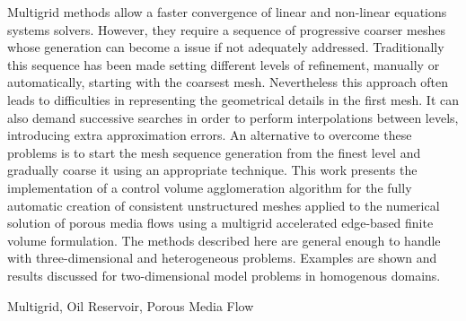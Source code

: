 Multigrid methods allow a faster convergence of linear and non-linear equations systems solvers. However, they require a sequence of progressive coarser meshes whose generation can become a issue if not adequately addressed. Traditionally this sequence has been made setting different levels of refinement, manually or automatically, starting with the coarsest mesh. Nevertheless this approach often leads to difficulties in representing the geometrical details in the first mesh. It can also demand successive searches in order to perform interpolations between levels, introducing extra approximation errors. An alternative to overcome these problems is to start the mesh sequence generation from the finest level and gradually coarse it using an appropriate technique. This work presents the implementation of a control volume agglomeration algorithm for the fully automatic creation of consistent unstructured meshes applied to the numerical solution of porous media flows using a multigrid accelerated edge-based finite volume formulation. The methods described here are general enough to handle with three-dimensional and heterogeneous problems. Examples are shown and results discussed for two-dimensional model problems in homogenous domains.

\begin{keywords}
Multigrid, Oil Reservoir, Porous Media Flow
\end{keywords}
